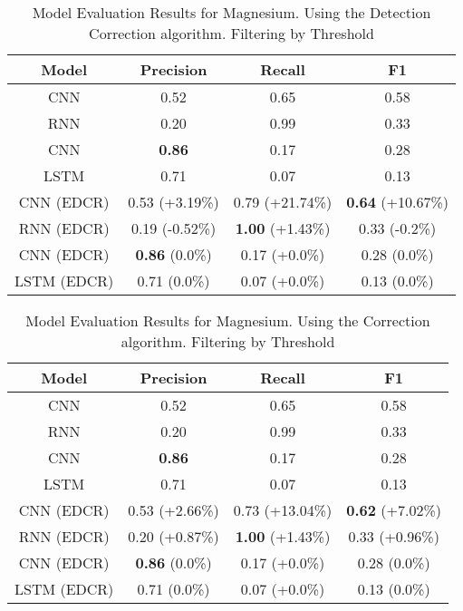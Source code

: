 \begin{table}
\centering
\begin{tabular}{|c|c|c|c|}
\hline
Model & Precision & Recall & F1\\
\hline
CNN  & 0.52 & 0.65 & 0.58\\
RNN  & 0.20 & 0.99 & 0.33\\
CNN  & \textbf{0.86} & 0.17 & 0.28\\
LSTM  & 0.71 & 0.07 & 0.13\\

\hline
CNN  (EDCR) & 0.53 (+3.19\%) & 0.79 (+21.74\%) & \textbf{0.64} (+10.67\%)\\
RNN  (EDCR) & 0.19 (-0.52\%) & \textbf{1.00} (+1.43\%) & 0.33 (-0.2\%)\\
CNN  (EDCR) & \textbf{0.86} (0.0\%) & 0.17 (+0.0\%) & 0.28 (0.0\%)\\
LSTM  (EDCR) & 0.71 (0.0\%) & 0.07 (+0.0\%) & 0.13 (0.0\%)\\

\hline
\end{tabular}
\caption{Model Evaluation Results for Magnesium. Using the Detection Correction algorithm. Filtering by Threshold}
\end{table}
\begin{table}
\centering
\begin{tabular}{|c|c|c|c|}
\hline
Model & Precision & Recall & F1\\
\hline
CNN  & 0.52 & 0.65 & 0.58\\
RNN  & 0.20 & 0.99 & 0.33\\
CNN  & \textbf{0.86} & 0.17 & 0.28\\
LSTM  & 0.71 & 0.07 & 0.13\\

\hline
CNN  (EDCR) & 0.53 (+2.66\%) & 0.73 (+13.04\%) & \textbf{0.62} (+7.02\%)\\
RNN  (EDCR) & 0.20 (+0.87\%) & \textbf{1.00} (+1.43\%) & 0.33 (+0.96\%)\\
CNN  (EDCR) & \textbf{0.86} (0.0\%) & 0.17 (+0.0\%) & 0.28 (0.0\%)\\
LSTM  (EDCR) & 0.71 (0.0\%) & 0.07 (+0.0\%) & 0.13 (0.0\%)\\

\hline
\end{tabular}
\caption{Model Evaluation Results for Magnesium. Using the Correction algorithm. Filtering by Threshold}
\end{table}

